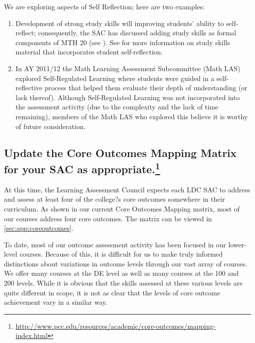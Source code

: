 \begin{description}
	We are exploring aspects of Self Reflection; here are two examples:
	\begin{enumerate}
		\item
		Development of strong study skills will improving students' ability to self-reflect; consequently,
		the SAC has discussed adding study skills as formal components
		of MTH 20 (see ).  See 
		for more information on study skills material that incorporates student
		self-reflection.
		\item
		In AY 2011/12 the Math Learning Assessment Subcommittee (Math LAS) explored
		Self-Regulated Learning where students were guided in a self-reflective
		process that helped them evaluate their depth of understanding (or lack
		thereof).  Although Self-Regulated Learning was not incorporated into the
		assessment activity (due to the complexity and the lack of time remaining),
		members of the Math LAS who explored this believe it is worthy of future
		consideration.
	\end{enumerate}
\end{description}

\subsection[Core outcomes mapping matrix]{Update the Core Outcomes Mapping Matrix for your SAC as
appropriate.\footnote{\url{http://www.pcc.edu/resources/academic/core-outcomes/mapping-index.html}}}
At this time, the Learning Assessment Council expects each LDC SAC to address and assess at least four of the college?s core outcomes somewhere in their curriculum. As shown in our current Core Outcomes Mapping matrix, most of our courses address four core outcomes.  The matrix can be viewed in \vref{sec:app:coreoutcomes}.

To date, most of our outcome assessment activity has been focused in our
lower-level courses. Because of this, it is difficult for us to make truly
informed distinctions about variations in outcome levels through our vast array
of courses.  We offer many courses at the DE level as well as many courses at
the 100 and 200 levels.  While it is obvious that the skills assessed at these
various levels are quite different in scope, it is not as clear that the levels
of core outcome achievement vary in a similar way.

